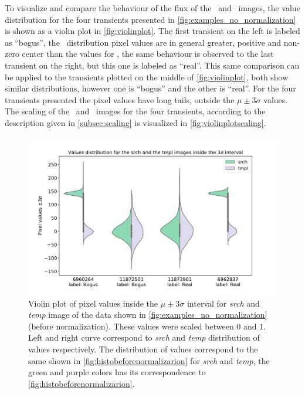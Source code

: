 To visualize and compare the behaviour of the flux of the \search\ and \temp\ images, the value distribution for the four transients presented in \autoref{fig:examples_no_normalization} is shown as a violin plot in \autoref{fig:violinplot}. The first transient on the left is labeled as ``bogus'', the \search\ distribution pixel values are in general greater, positive and non-zero center than the values for \temp, the same behaviour is observed to the last transient on the right, but this one is labeled as ``real''. This same comparison can be applied to the transients plotted on the middle of \autoref{fig:violinplot}, both show similar distributions, however one is ``bogus'' and the other is ``real''. For the four transients presented the pixel values have long tails, outside the $\mu \pm 3\sigma$ values. The scaling of the \search\ and \temp\ images for the four transients, according to the description given in \autoref{subsec:scaling} is visualized in \autoref{fig:violinplotscaling}. 

\begin{figure}[h]
    \centering
    \includegraphics[width=0.6\linewidth]{
    figures/violin_plot.pdf}
    \caption{Violin plot of pixel values inside the $\mu \pm 3\sigma$ interval for \textit{srch} and \textit{temp} image of %
    the data shown in \autoref{fig:examples_no_normalization} (before normalization). These values were scaled between $0$ and $1$. Left and right curve correspond to \textit{srch} and \textit{temp} distribution of values respectively. The distribution of values correspond to the same shown in \autoref{fig:histobeforenormalizarion} for \textit{srch} and \textit{temp}, the green and purple colors has its correspondence to \autoref{fig:histobeforenormalizarion}.}
    \label{fig:violinplot}
\end{figure}



